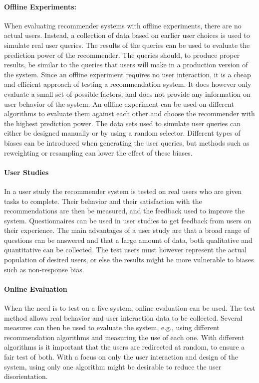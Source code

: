 \paragraph{Offline Experiments:} When evaluating recommender systems with offline experiments, there are no actual users. Instead, a collection of data based on earlier user choices is used to simulate real user queries. The results of the queries can be used to evaluate the prediction power of the recommender. The queries should, to produce proper results, be similar to the queries that users will make in a production version of the system. Since an offline experiment requires no user interaction, it is a cheap and efficient approach of testing a recommendation system. It does however only evaluate a small set of possible factors, and does not provide any information on user behavior of the system.  An offline experiment can be used on different algorithms to evaluate them against each other and choose the recommender with the highest prediction power. The data sets used to simulate user queries can either be designed manually or by using a random selector. Different types of biases can be introduced when generating the user queries, but methods such as reweighting or resampling can lower the effect of these biases. 

\paragraph{User Studies} In a user study the recommender system is tested on real users who are given tasks to complete. Their behavior and their satisfaction with the recommendations are then be measured, and the feedback used to improve the system. Questionnaires can be used in user studies to get feedback from users on their experience. The main advantages of a user study are that a broad range of questions can be answered and that a large amount of data, both qualitative and quantitative can be collected. The test users must however represent the actual population of desired users, or else the results might be more vulnerable to biases such as non-response bias.

\paragraph{Online Evaluation} When the need is to test on a live system, online evaluation can be used. The test method allows real behavior  and user interaction data to be collected. Several measures can then be used to evaluate the system, e.g., using different recommendation algorithms and measuring the use of each one. With different algorithms is it important that the users are redirected at random, to ensure a fair test of both. With a focus on only the user interaction and design of the system, using only one algorithm might be desirable to reduce the user disorientation. 

\cleardoublepage